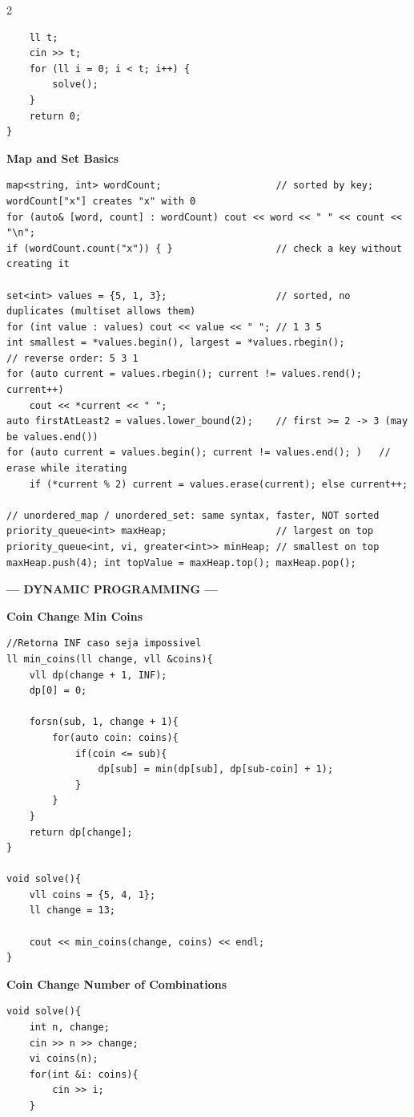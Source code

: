 \documentclass{article}
\begin{document}
\begin{multicols}{2}
\begin{lstlisting}
    ll t;
    cin >> t;
    for (ll i = 0; i < t; i++) {
        solve();
    }
    return 0;
}
\end{lstlisting}

\large
\Large\textbf{Map and Set Basics}
\large
\begin{lstlisting}
map<string, int> wordCount;                    // sorted by key; wordCount["x"] creates "x" with 0
for (auto& [word, count] : wordCount) cout << word << " " << count << "\n";
if (wordCount.count("x")) { }                  // check a key without creating it

set<int> values = {5, 1, 3};                   // sorted, no duplicates (multiset allows them)
for (int value : values) cout << value << " "; // 1 3 5
int smallest = *values.begin(), largest = *values.rbegin();
// reverse order: 5 3 1
for (auto current = values.rbegin(); current != values.rend(); current++)
	cout << *current << " ";
auto firstAtLeast2 = values.lower_bound(2);    // first >= 2 -> 3 (may be values.end())
for (auto current = values.begin(); current != values.end(); )   // erase while iterating
	if (*current % 2) current = values.erase(current); else current++;

// unordered_map / unordered_set: same syntax, faster, NOT sorted
priority_queue<int> maxHeap;                   // largest on top
priority_queue<int, vi, greater<int>> minHeap; // smallest on top
maxHeap.push(4); int topValue = maxHeap.top(); maxHeap.pop();
\end{lstlisting}

\large
\begin{center}
\huge\textbf{--- DYNAMIC PROGRAMMING ---}
\end{center}
\large

\large
\Large\textbf{Coin Change Min Coins}
\large
\begin{lstlisting}
//Retorna INF caso seja impossivel
ll min_coins(ll change, vll &coins){
	vll dp(change + 1, INF); 
	dp[0] = 0; 

	forsn(sub, 1, change + 1){
		for(auto coin: coins){
			if(coin <= sub){
				dp[sub] = min(dp[sub], dp[sub-coin] + 1);
			}
		}
	}
	return dp[change];
}

void solve(){
	vll coins = {5, 4, 1};
	ll change = 13; 
	
	cout << min_coins(change, coins) << endl;
}
\end{lstlisting}

\large
\Large\textbf{Coin Change Number of Combinations}
\large
\begin{lstlisting}
void solve(){
	int n, change;
	cin >> n >> change;
	vi coins(n);
	for(int &i: coins){
		cin >> i;
	}


\end{lstlisting}
\end{multicols}
\end{document}
